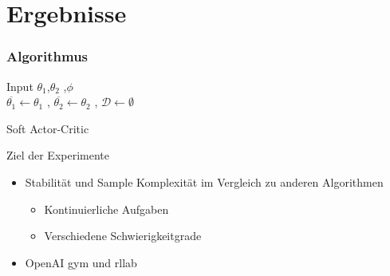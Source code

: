 \section{Ergebnisse}


\begin{frame}
    \frametitle{Algorithmus}
    \begin{algorithm}[H]
        {\small
        \SetAlgoLined
        Input $\theta_{1}$,$\theta_{2}$ ,$\phi$\\
        $\overline{\theta_{1}} \leftarrow  \theta_{1}$ ,
        $\overline{\theta_{2}} \leftarrow \theta_{2}$ ,
        $\mathcal{D} \leftarrow \emptyset$\\
        }
         \caption{Soft Actor-Critic}
        \end{algorithm}
     
\end{frame}

\begin{frame}{Ziel der Experimente}
        \begin{itemize}
            \item Stabilität und Sample Komplexität im Vergleich zu anderen Algorithmen
            \begin{itemize}
                \item Kontinuierliche Aufgaben
                \item Verschiedene Schwierigkeitgrade
            \end{itemize}  
            \item OpenAI gym und rllab
        \end{itemize}
\end{frame}

